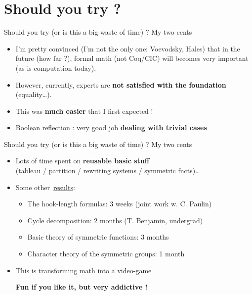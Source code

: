 \documentclass[compress,11pt]{beamer}
\newcommand{\grn}[1]{{\color{green} #1}}
\begin{document}
\section{Should you try ?}

\begin{frame}{Should you try {\tiny(or is this a big waste of time)} ? My two cents}

  \begin{itemize}
  \item I'm pretty convinced (I'm not the only one: Voevodsky, Hales) that
    in the future (how far ?), formal math (not Coq/CIC) will becomes very
    important (as is computation today).  \bigskip\pause

  \item However, currently, experts are \textbf{not satisfied
      with the foundation} (equality\dots). \bigskip\pause

  \item This was \textbf{much easier} that I first expected !
    \bigskip\pause

  \item Boolean reflection : very good job \textbf{dealing with trivial cases}
  \end{itemize}
\end{frame}

\begin{frame}{Should you try {\tiny(or is this a big waste of time)} ? My two cents}

  \begin{itemize}
  \item Lots of time spent on \textbf{reusable basic stuff}\\
    (tableau / partition / rewriting systems / symmetric fncts)\dots
    \bigskip

  \item Some
    other~\href{file:html/index.html}{results}:\medskip
    \begin{itemize}
    \item The hook-length formulas: 3 weeks (joint work w. C. Paulin)
      \medskip
    \item Cycle decomposition: 2 months (T. Benjamin, undergrad)
      \medskip
    \item Basic theory of symmetric functions: 3 months
      \medskip
    \item Character theory of the symmetric groups: 1 month
    \end{itemize}
    \bigskip\pause

  \item This is transforming math into a video-game \medskip

    \hfill\grn{\bf Fun if you like it, but very addictive !}
  \end{itemize}
\end{frame}
\end{document}
